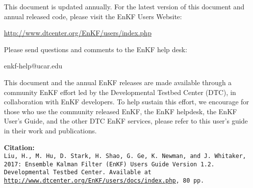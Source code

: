 \begin{titlepage}
\begin{flushleft}
This document is updated annually. For the latest version of this document and annual released code, please visit the EnKF User\textquotesingle s Website:
\begin{center}
 \url{http://www.dtcenter.org/EnKF/users/index.php}
 \end{center}
 Please send questions and comments to the EnKF help desk:
\begin{center}
enkf-help@ucar.edu
\end{center}
This document and the annual EnKF releases are made available through a community EnKF effort led by the Developmental Testbed Center (DTC), in collaboration with EnKF developers. To help sustain this effort, we encourage for those who use the community released EnKF, the EnKF helpdesk, the EnKF User's Guide, and the other DTC EnKF services, please refer to this user's guide in their work and publications.


\textbf{Citation:}\\
\texttt{Liu, H., M. Hu, D. Stark, H. Shao, G. Ge, K. Newman, and J. Whitaker, 2017: Ensemble Kalman Filter (EnKF) User\textquotesingle s Guide Version 1.2. Developmental Testbed Center. Available at \url{http://www.dtcenter.org/EnKF/users/docs/index.php}, 80 pp.}

\end{flushleft}
\end{titlepage}
\pagebreak{}




